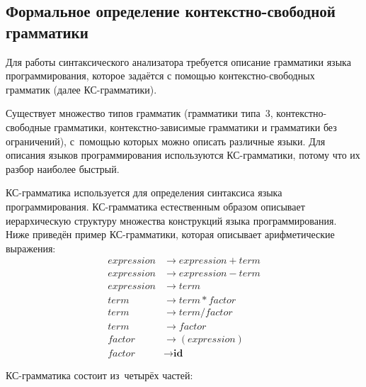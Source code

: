 \subsection{Формальное определение контекстно-свободной грамматики} \label{sub114}

Для работы синтаксического анализатора требуется описание грамматики языка программирования, которое задаётся с помощью контекстно-свободных грамматик (далее КС-грамматики).

Существует множество типов грамматик (грамматики типа~3, контекстно-свободные грамматики, контекстно-зависимые грамматики и грамматики без ограничений), с~помощью которых можно описать различные языки. Для описания языков программирования используются КС-грамматики, потому что их разбор наиболее быстрый.

КС-грамматика используется для определения синтаксиса языка программирования. КС-грамматика естественным образом описывает иерархическую структуру множества конструкций языка программирования. Ниже приведён пример КС-грамматики, которая описывает арифметические выражения:
\begin{align*}
	expression &\to expression + term \\
	expression &\to expression - term \\
	expression &\to term \\
	term &\to term * factor \\
	term &\to term / factor \\ 
	term &\to factor \\
	factor &\to (expression) \\
	factor &\to \textbf{id}
\end{align*}

КС-грамматика состоит из~четырёх частей:
 
